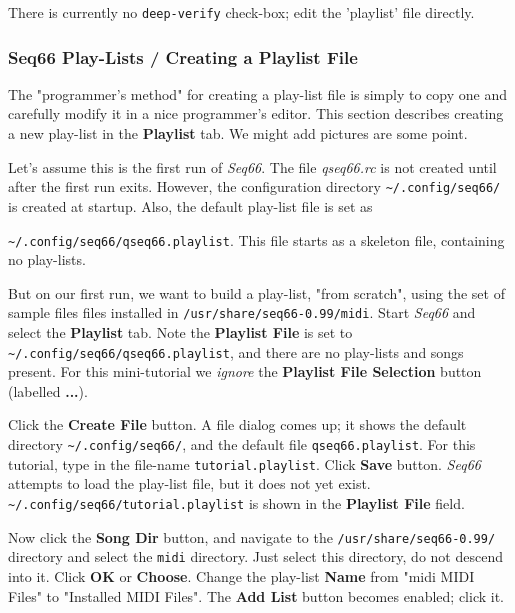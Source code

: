    There is currently no \texttt{deep-verify} check-box; edit the 'playlist'
   file directly.

\subsubsection{Seq66 Play-Lists / Creating a Playlist File}
\label{subsubsec:playlist_creating_playlist_file}

   The "programmer's method" for creating a play-list file is simply to copy
   one and carefully modify it in a nice programmer's editor.
   This section describes creating a new play-list in the \textbf{Playlist}
   tab.  We might add pictures are some point.

   Let's assume this is the first run of \textsl{Seq66}.
   The file \textsl{qseq66.rc} is not created until after the first
   run exits.
   However, the configuration directory
   \texttt{\textasciitilde/.config/seq66/} is created at startup.
   Also, the default play-list file is set as

   \texttt{\textasciitilde/.config/seq66/qseq66.playlist}.
   This file starts as a skeleton file, containing no play-lists.

   But on our first run, we want to build a play-list, "from scratch",
   using the set of sample files files installed in
   \texttt{/usr/share/seq66-0.99/midi}.
   Start \textsl{Seq66} and select the \textbf{Playlist} tab.
   Note the \textbf{Playlist File} is set to
   \texttt{\textasciitilde/.config/seq66/qseq66.playlist}, and
   there are no play-lists and songs present.
   For this mini-tutorial we \textsl{ignore}
   the \textbf{Playlist File Selection}
   button (labelled \textbf{...}).

   Click the \textbf{Create File} button.
   A file dialog comes up; it shows the default directory
   \texttt{\textasciitilde/.config/seq66/}, and the default file
   \texttt{qseq66.playlist}.
   For this tutorial, type in the file-name
   \texttt{tutorial.playlist}.
   Click \textbf{Save} button.
   \textsl{Seq66} attempts to load the play-list file, but it
   does not yet exist.
   \texttt{\textasciitilde/.config/seq66/tutorial.playlist} is
   shown in the \textbf{Playlist File} field.

   Now click the \textbf{Song Dir} button,
   and navigate to the
   \texttt{/usr/share/seq66-0.99/} directory and select the
   \texttt{midi} directory.
   Just select this directory, do not descend into it.
   Click \textbf{OK} or \textbf{Choose}.
   Change the play-list \textbf{Name} from
   "midi MIDI Files" to "Installed MIDI Files".
   The \textbf{Add List} button becomes enabled; click it.
   

